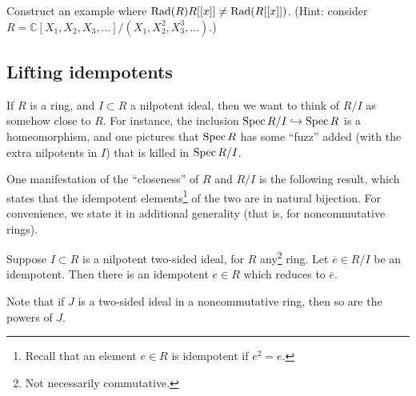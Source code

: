 \begin{exercise} 
Construct an example where $\operatorname{Rad}(R) R[[x]] \neq \operatorname{Rad}(R[[x]])$. (Hint: consider
$R = \mathbb{C}[X_1, X_2, X_3, \dots]/(X_1, X_2^2, X_3^3, \dots)$.)
\end{exercise} 

\subsection{Lifting idempotents}

If $R$ is a ring, and $I \subset R$ a nilpotent ideal, then we want to think
of $R/I$ as somehow close to $R$. For instance, the inclusion $\operatorname{Spec} R/I
\hookrightarrow \operatorname{Spec} R$ is a homeomorphism, and one pictures that $\operatorname{Spec} R$
has some ``fuzz'' added (with the extra nilpotents in $I$) that is killed in
$\operatorname{Spec} R/I$.

One manifestation of the ``closeness'' of $R$ and $R/I$ is the following
result, which states that the idempotent elements\footnote{Recall that an
element $e \in R$ is idempotent if $e^2 = e$.} of the two are in natural
bijection.
For convenience, we state it in additional generality (that is, for
noncommutative rings).

\begin{lemma}
Suppose $I \subset R$ is a nilpotent two-sided ideal, for $R$ any\footnote{Not
necessarily commutative.} ring. Let
$\overline{e} \in R/I$ be an idempotent. Then there is an idempotent $e
\in R$ which reduces to $\overline{e}$.
\end{lemma} 

Note that if $J$ is a two-sided ideal in a noncommutative ring, then so are the
powers of $J$.

